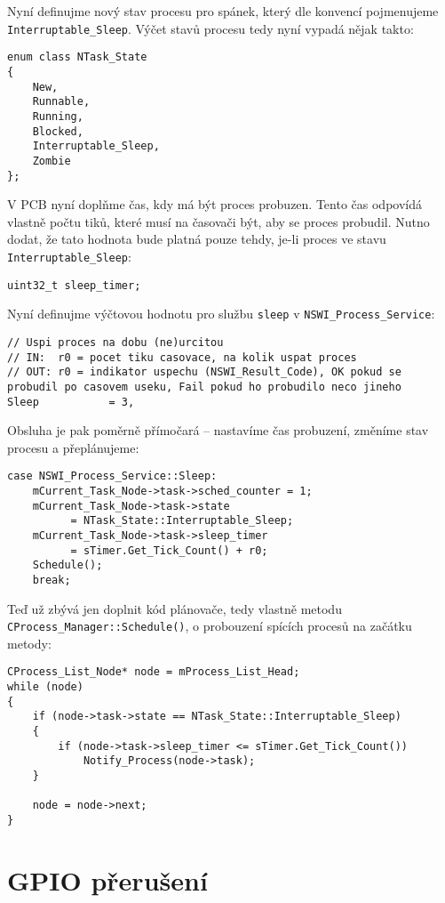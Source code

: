 \documentclass{article}
\begin{document}
Nyní definujme nový stav procesu pro spánek, který dle konvencí pojmenujeme \texttt{Interruptable\_Sleep}. Výčet stavů procesu tedy nyní vypadá nějak takto:
\begin{lstlisting}
enum class NTask_State
{
	New,
	Runnable,
	Running,
	Blocked,
	Interruptable_Sleep,
	Zombie
};
\end{lstlisting}

V PCB nyní doplňme čas, kdy má být proces probuzen. Tento čas odpovídá vlastně počtu tiků, které musí na časovači být, aby se proces probudil. Nutno dodat, že tato hodnota bude platná pouze tehdy, je-li proces ve stavu \texttt{Interruptable\_Sleep}:
\begin{lstlisting}
uint32_t sleep_timer;
\end{lstlisting}

Nyní definujme výčtovou hodnotu pro službu \texttt{sleep} v \texttt{NSWI\_Process\_Service}:
\begin{lstlisting}
// Uspi proces na dobu (ne)urcitou
// IN:  r0 = pocet tiku casovace, na kolik uspat proces
// OUT: r0 = indikator uspechu (NSWI_Result_Code), OK pokud se probudil po casovem useku, Fail pokud ho probudilo neco jineho
Sleep           = 3,
\end{lstlisting}

Obsluha je pak poměrně přímočará -- nastavíme čas probuzení, změníme stav procesu a přeplánujeme:
\begin{lstlisting}
case NSWI_Process_Service::Sleep:
    mCurrent_Task_Node->task->sched_counter = 1;
    mCurrent_Task_Node->task->state 
          = NTask_State::Interruptable_Sleep;
    mCurrent_Task_Node->task->sleep_timer
          = sTimer.Get_Tick_Count() + r0;
    Schedule();
    break;
\end{lstlisting}

Teď už zbývá jen doplnit kód plánovače, tedy vlastně metodu \texttt{CProcess\_Manager::Schedule()}, o probouzení spících procesů na začátku metody:
\begin{lstlisting}
CProcess_List_Node* node = mProcess_List_Head;
while (node)
{
    if (node->task->state == NTask_State::Interruptable_Sleep)
    {
        if (node->task->sleep_timer <= sTimer.Get_Tick_Count())
            Notify_Process(node->task);
    }

    node = node->next;
}
\end{lstlisting}

\section{GPIO přerušení}
\end{document}

